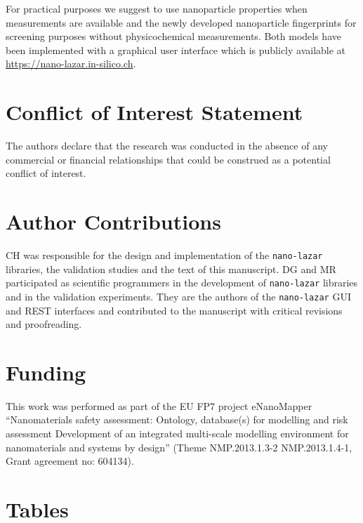 \documentclass[utf8]{frontiersHLTH} %
\begin{document}
For practical purposes we suggest to use nanoparticle properties when
measurements are available and the newly developed nanoparticle
fingerprints for screening purposes without physicochemical
measurements. Both models have been implemented with a graphical user
interface which is publicly available at
\url{https://nano-lazar.in-silico.ch}.

\section{Conflict of Interest
Statement}\label{conflict-of-interest-statement}

The authors declare that the research was conducted in the absence of
any commercial or financial relationships that could be construed as a
potential conflict of interest.

\section{Author Contributions}\label{author-contributions}

CH was responsible for the design and implementation of the
\texttt{nano-lazar} libraries, the validation studies and the text of
this manuscript. DG and MR participated as scientific programmers in the
development of \texttt{nano-lazar} libraries and in the validation
experiments. They are the authors of the \texttt{nano-lazar} GUI and
REST interfaces and contributed to the manuscript with critical
revisions and proofreading.

\section{Funding}\label{funding}

This work was performed as part of the EU FP7 project eNanoMapper
``Nanomaterials safety assessment: Ontology, database(s) for modelling
and risk assessment Development of an integrated multi-scale modelling
environment for nanomaterials and systems by design'' (Theme
NMP.2013.1.3-2 NMP.2013.1.4-1, Grant agreement no: 604134).

\section{Tables}\label{tables}
\end{document}
